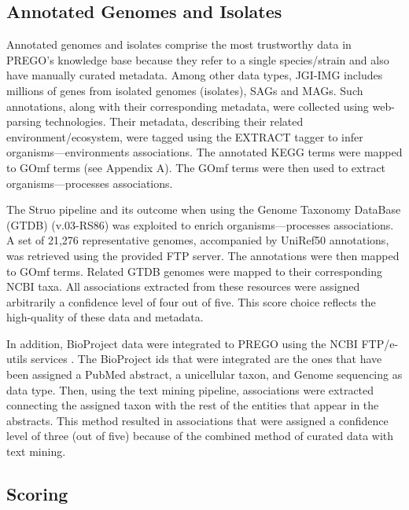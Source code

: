    \subsection{Annotated Genomes and Isolates}
   \label{subsec:prego-isolates}

   Annotated genomes and isolates comprise the most trustworthy data in PREGO's knowledge base because they refer to a single species/strain and also have manually curated metadata. 
   Among other data types, JGI-IMG \parencite{chen2021img, mukherjee2021genomes} includes millions of genes from isolated genomes (isolates), SAGs and MAGs. Such annotations, along with their corresponding metadata, were collected using web-parsing technologies. Their metadata, describing their related environment/ecosystem, were tagged using the EXTRACT tagger to infer organisms—environments associations. The annotated KEGG terms were mapped to GOmf terms (see Appendix A). The GOmf terms were then used to extract organisms—processes associations.
   
   The Struo pipeline \parencite{de2020struo} and its outcome when using the Genome Taxonomy DataBase (GTDB) (v.03-RS86) \parencite{parks2020complete} was exploited to enrich organisms—processes associations. 
   A set of 21,276 representative genomes, accompanied by UniRef50 annotations, was retrieved using the provided FTP server. The annotations were then mapped to GOmf terms. 
   Related GTDB genomes were mapped to their corresponding NCBI taxa. 
   All associations extracted from these resources were assigned arbitrarily a confidence level of four out of five. 
   This score choice reflects the high-quality of these data and metadata.
   
   In addition, BioProject data were integrated to PREGO using the NCBI FTP/e-utils services \parencite{sayers2021database}. 
   The BioProject ids that were integrated are the ones that have been assigned a PubMed abstract, a unicellular taxon, and Genome sequencing as data type. Then, using the text mining pipeline, associations were extracted connecting the assigned taxon with the rest of the entities that appear in the abstracts. This method resulted in associations that were assigned a confidence level of three (out of five) because of the combined method of curated data with text mining.


\subsection{Scoring}
\label{scoring}

